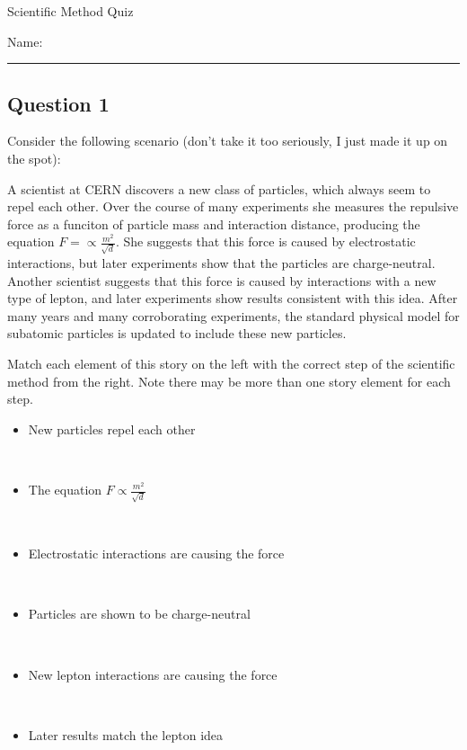 \documentclass[11pt, letterpaper]{memoir}
\begin{document}
\begin{center}
	{\large	Scientific Method Quiz}
\end{center}
{\large Name: \rule[-1mm]{4in}{.1pt}
\subsection*{Question 1}
Consider the following scenario (don't take it too seriously, I just made it up on the spot):

A scientist at CERN discovers a new class of particles, which always seem to repel each other. Over the course of many experiments she measures the repulsive force as a funciton of particle mass and interaction distance, producing the equation $F=\propto\frac{m^2}{\sqrt{d}}$. She suggests that this force is caused by electrostatic interactions, but later experiments show that the particles are charge-neutral. Another scientist suggests that this force is caused by interactions with a new type of lepton, and later experiments show results consistent with this idea. After many years and many corroborating experiments, the standard physical model for subatomic particles is updated to include these new particles.

Match each element of this story on the left with the correct step of the scientific method from the right. Note there may be more than one story element for each step.

\noindent
\begin{minipage}{0.65\textwidth}
	\vspace{0.8em}
	\begin{itemize}
		\item New particles repel each other

		      ~

		\item The equation $F\propto\frac{m^2}{\sqrt{d}}$

		      ~

		\item Electrostatic interactions are causing the force

		      ~

		\item Particles are shown to be charge-neutral

		      ~

		\item New lepton interactions are causing the force

		      ~

		\item Later results match the lepton idea


\end{itemize}
\end{minipage}}
\end{document}
